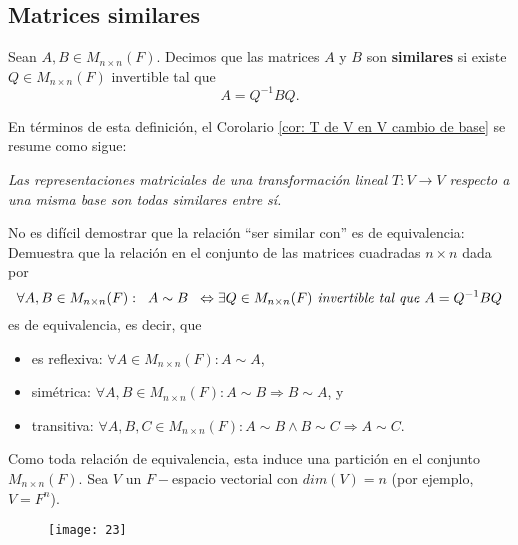 \subsection{Matrices similares}

\begin{defi}
Sean $A, B \in M_{n \times n}(F)$. Decimos que las matrices $A$ y $B$
son \textbf{similares} si existe $Q \in M_{n \times n}(F)$ invertible tal que
\[
A = Q^{-1}B Q.
\]
\end{defi}
En términos de esta definición, el Corolario 
\ref{cor: T de V en V cambio de base} se resume como sigue:
\begin{center}
\textit{Las representaciones matriciales de una transformación lineal
$T: V \longrightarrow V$ respecto a una misma base son todas similares entre
sí.}
\end{center}
No es difícil demostrar que la relación ``ser similar con''
es de equivalencia:
\noindent
{} Demuestra que la relación en el conjunto
de las matrices cuadradas $n \times n$ dada por
\[
\forall A, B \in M_{n \times n}(F): \hspace{0.2cm}
A \sim B \hspace{0.2cm} \Leftrightarrow
\exists Q \in M_{n \times n}(F) \textit{ invertible tal que }
A = Q^{-1}B Q
\]
es de equivalencia, es decir, que 
\begin{itemize}
	\item es reflexiva: $\forall A \in M_{n \times n}(F): A \sim A$,
	\item simétrica: $\forall A, B \in M_{n \times n}(F): A \sim B
	\Rightarrow B \sim A$, y
	\item transitiva: $\forall A, B, C \in M_{n \times n}(F):
	A \sim B \wedge B \sim C \Rightarrow A \sim C$.
\end{itemize}

Como toda relación de equivalencia, esta induce una partición
en el conjunto $M_{n \times n}(F)$. Sea $V$ un $F-$espacio vectorial
con $dim(V) = n$ (por ejemplo, $V = F^{n}$).

\begin{center}
\begin{figure}[H]
\centering
		\texttt{[image: 23]}
 \end{figure}
\end{center}
